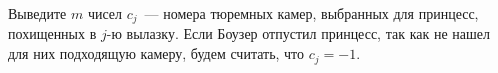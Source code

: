 Выведите $m$ чисел $c_j$~--- номера тюремных камер, выбранных для принцесс, похищенных в $j$-ю вылазку. Если Боузер отпустил принцесс, так как не нашел для них подходящую камеру, будем считать, что $c_j = -1$.